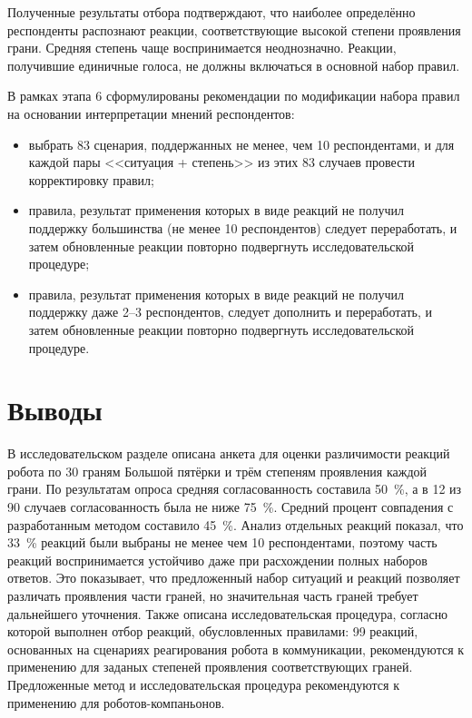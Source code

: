 	Полученные результаты отбора подтверждают, что наиболее определённо
	респонденты распознают реакции, соответствующие высокой степени проявления
	грани.
	Средняя степень чаще воспринимается неоднозначно.
	Реакции, получившие единичные голоса, не должны включаться в основной
	набор правил.

В рамках этапа 6 сформулированы рекомендации по модификации набора
	правил на основании интерпретации мнений респондентов:
\begin{itemize}
	\item выбрать 83 сценария, поддержанных не менее, чем 10 респондентами, и для каждой пары <<ситуация + степень>> из этих 83 случаев провести корректировку правил;
	\item правила, результат применения которых в виде реакций не получил поддержку большинства (не менее 10 респондентов) следует переработать, и затем обновленные реакции повторно подвергнуть исследовательской процедуре;
	\item правила, результат применения которых в виде реакций не получил поддержку даже 2--3 респондентов, следует дополнить и переработать, и затем обновленные реакции повторно подвергнуть исследовательской процедуре.
\end{itemize}


\section*{Выводы}

В исследовательском разделе описана анкета для оценки различимости реакций
робота по 30 граням Большой пятёрки и трём степеням проявления каждой грани.
По результатам опроса средняя согласованность составила 50~\%, а в 12 из 90 случаев согласованность была не ниже 75~\%.
Средний процент совпадения с разработанным методом составило 45~\%.
Анализ отдельных реакций показал, что 33~\% реакций были выбраны не менее чем 10 респондентами, поэтому часть реакций воспринимается устойчиво даже при расхождении полных наборов ответов.
Это показывает, что предложенный набор ситуаций и реакций позволяет различать проявления части граней, но значительная часть граней требует дальнейшего уточнения.
Также описана исследовательская процедура, согласно которой выполнен отбор реакций, обусловленных правилами: 99 реакций, основанных на сценариях реагирования робота в коммуникации, рекомендуются к применению для заданых степеней проявления соответствующих граней.
Предложенные метод и исследовательская процедура рекомендуются к применению для роботов-компаньонов.